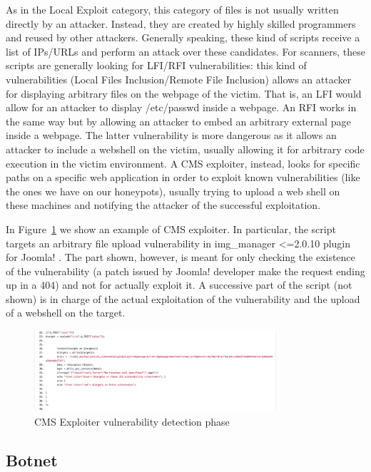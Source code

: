 As in the Local Exploit category, this category of files is not usually written directly by an attacker. Instead, they are created by highly skilled programmers and reused by other attackers. Generally speaking, these kind of scripts receive a list of IPs/URLs and perform an attack over these candidates.
For scanners, these scripts are generally looking for LFI/RFI vulnerabilities: this kind of vulnerabilities (Local Files Inclusion/Remote File Inclusion) allows an attacker for displaying arbitrary files on the webpage of the victim. That is, an LFI would allow for an attacker to display /etc/passwd inside a webpage. An RFI works in the same way but by allowing an attacker to embed an arbitrary external page inside a webpage. The latter vulnerability is more dangerous as it allows an attacker to include a webshell on the victim, usually allowing it for arbitrary code execution in the victim environment.
A CMS exploiter, instead, looks for specific paths on a specific web application in order to exploit known vulnerabilities (like the ones we have on our honeypots), usually trying to upload a web shell on these machines and notifying the attacker of the successful exploitation.

In Figure~\ref{fig:attackerScript} we show an example of CMS exploiter. In particular, the script targets an arbitrary file upload vulnerability in img\_manager <=2.0.10 plugin for Joomla! \cite{joomlaImgManager}. The part shown, however, is meant for only checking the existence of the vulnerability (a patch issued by Joomla! developer make the request ending up in a 404) and not for actually exploit it. A successive part of the script (not shown) is in charge of the actual exploitation of the  vulnerability and the upload of a webshell on the target.

\begin{figure}[H]
\centerline{\includegraphics[width=0.8\textwidth]{Images/attackerScript.jpg}}
\caption{CMS Exploiter vulnerability detection phase\label{fig:attackerScript}}
\end{figure}


\subsection{Botnet}

